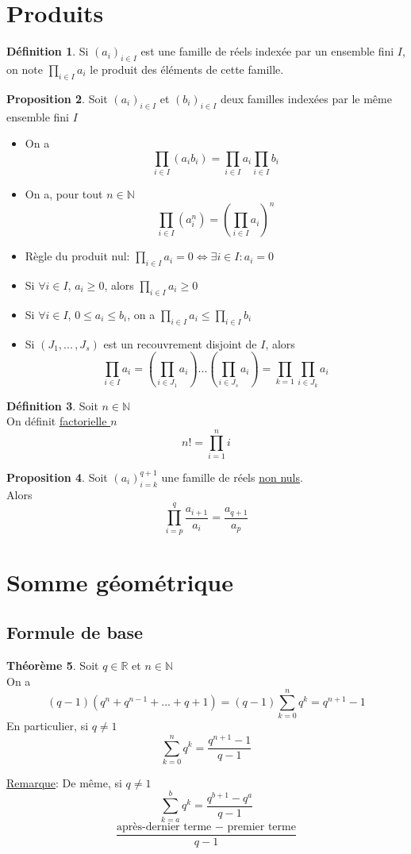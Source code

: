 \documentclass[10pt,a4paper]{article}
\theoremstyle{definition}
\newtheorem{proposition}{Proposition}[section]
\newtheorem{theorem}[proposition]{Théorème}
\newtheorem{definition}[proposition]{Définition}
\begin{document}
\section{Produits}
\begin{definition}
Si $(a_i)_{i \in I}$ est une famille de réels indexée par un ensemble fini $I$, \\
on note $\prod\limits_{i \in I} a_i$ le produit des éléments de cette famille.
\end{definition}
\begin{proposition}
Soit $(a_i)_{i \in I}$ et $(b_i)_{i \in I}$ deux familles indexées par le même ensemble fini $I$
\begin{itemize}
\item On a
\[\prod\limits_{i \in I}(a_i b_i) = \prod\limits_{i \in I} a_i \prod\limits_{i \in I} b_i\]
\item On a, pour tout $n \in \mathbb{N}$
\[\prod\limits_{i \in I}(a_i^n) = \left(\prod\limits_{i \in I} a_i \right)^n\]
\item Règle du produit nul: $\prod\limits_{i \in I} a_i = 0 \iff \exists i \in I: a_i = 0$
\item Si $\forall i \in I$, $a_i \geq 0$, alors $\prod\limits_{i \in I} a_i \geq 0$
\item Si $\forall i \in I$, $0 \leq a_i \leq b_i$, on a $\prod\limits_{i \in I} a_i \leq \prod\limits_{i \in I} b_i$
\item Si $(J_1, ...\,, J_s)$ est un recouvrement disjoint de $I$, alors
\[\prod_{i \in I} a_i = \left( \prod_{i \in J_1} a_i \right) ... \left( \prod_{i \in J_s} a_i \right) = \prod_{k = 1} \prod_{i \in J_k} a_i \]
\end{itemize}
\end{proposition}
\begin{definition}
Soit $n \in \mathbb{N}$ \\
On définit \uline{factorielle $n$}
\[ n! = \prod_{i = 1}^n i \]
\end{definition}
\begin{proposition}
Soit $(a_i)_{i = k}^{q + 1}$ une famille de réels \uline{non nuls}. \\
Alors
\[ \prod_{i = p}^q \frac{a_{i + 1}}{a_i} = \frac{a_{q + 1}}{a_p} \]
\end{proposition}

\section{Somme géométrique}
\subsection{Formule de base}
\begin{theorem}
Soit $q \in \mathbb{R}$ et $n \in \mathbb{N}$ \\
On a
\[ (q - 1)(q^n + q^{n - 1} + ... + q + 1) = (q - 1)\sum_{k = 0}^n q^k = q^{n + 1} - 1 \]
En particulier, si $q \neq 1$
\[ \sum_{k = 0}^n q^k = \frac{q^{n + 1} - 1}{q - 1} \]
\end{theorem}
\noindent \uline{Remarque}: De même, si $q \neq 1$
\[ \sum_{k = a}^b q^k  = \frac{q^{b + 1} - q^a}{q - 1} \]
\[\frac{\text{après-dernier terme } - \text{ premier terme}}{q - 1}\]
\end{document}
